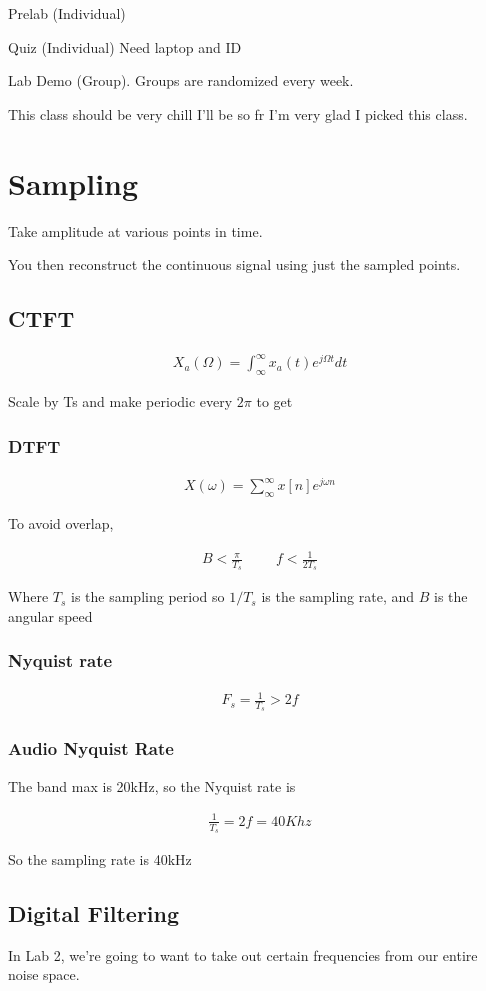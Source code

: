 \documentclass[fleqn]{report}
\newcommand{\hp}{\hspace{1cm}}
\newcommand{\equations} [1] {
\begin{gather*}
#1
\end{gather*}
}
\begin{document}
Prelab (Individual)

Quiz (Individual)
Need laptop and ID 

Lab Demo (Group).
Groups are randomized every week. 

This class should be very chill I'll be so fr I'm very glad I picked this 
class. 

\chapter{Sampling}
Take amplitude at various points in time.

You then reconstruct the continuous signal using just the sampled points. 

\section{CTFT}
\equations{
    X_a(\Omega)
    =
    \int^{\infty}_{\infty}
    x_a(t) e^{j \Omega t} dt
}

Scale by Ts and make periodic every $2 \pi$ to get 

\subsection{DTFT}
\equations{
    X(\omega)
    =
    \sum^{\infty}_{\infty}
    x[n] e^{j \omega n}
}

To avoid overlap,
\equations{
    B 
    <
    \frac{\pi}{T_s}
    \hp 
    f < \frac{1}{2 T_s}
}

Where $T_s$ is the sampling period so $1/T_s$ is the sampling rate,
 and $B$ is the angular speed 

\subsection{Nyquist rate}
\equations{
    F_s 
    =
    \frac{1}{T_s}
    > 2f
}

\subsection{Audio Nyquist Rate}
The band max is 20kHz, so the Nyquist rate is 

\equations{
    \frac{1}{T_s}
    =
    2f = 40 Khz
}

So the sampling rate is 40kHz

\section{Digital Filtering}
In Lab 2, we're going to want to take out certain frequencies from 
our entire noise space.
\end{document}
